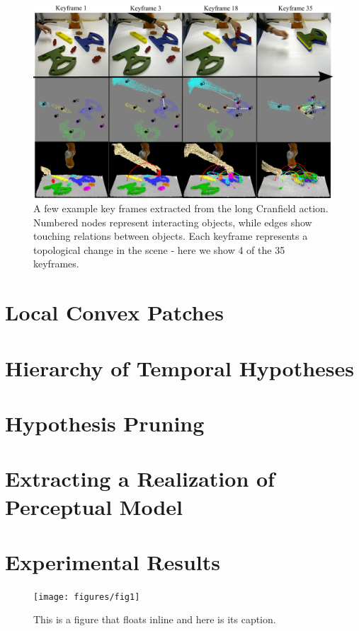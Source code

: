 \begin{figure}[ht!]
  \centering
  \includegraphics[scale=0.84]{figures/IROS2013/SECKF.pdf}
  \caption[Cranfield Key Frames]{A few example key frames extracted from the long Cranfield action. Numbered nodes represent interacting objects, while edges show touching relations between objects. Each keyframe represents a topological change in the scene - here we show 4 of the 35 keyframes.}
  \label{fig:SECGraphs}
\end{figure}



\section{Local Convex Patches}
\section{Hierarchy of Temporal Hypotheses}
\section{Hypothesis Pruning}
\section{Extracting a Realization of Perceptual Model}
\section{Experimental Results}

\begin{figure}
\texttt{[image: figures/fig1]}
\caption[Short figure name.]{This is a figure that floats inline and here is its caption.
\label{fig:myInlineFigure}}
\end{figure}



